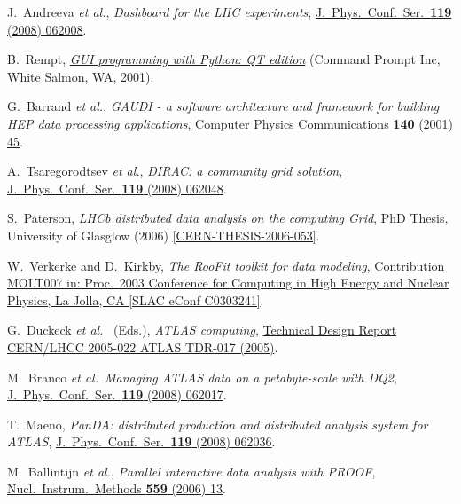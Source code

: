 \documentclass{elsart}
\def\etal {\textit{et al.}}
\begin{document}
\begin{linenumbers}
\begin{thebibliography}{00}
 J.~Andreeva \etal,
\textit{Dashboard for the LHC experiments},
\href{http://dx.doi.org/10.1088/1742-6596/119/6/062008}
{J.\ Phys.\ Conf.\ Ser.\ \textbf{119} (2008) 062008}.

 B.~Rempt,
\href{http://www.commandprompt.com/community/pyqt/}
{\textit{GUI programming with Python: QT edition}}
(Command Prompt Inc, White Salmon, WA, 2001).

 G.~Barrand \etal,
\textit{GAUDI - a software architecture and framework for building HEP
data processing applications},
\href{http://dx.doi.org/10.1016/S0010-4655(01)00254-5}
{Computer Physics Communications \textbf{140} (2001) 45}.

 A.~Tsaregorodtsev \etal,
\textit{DIRAC: a community grid solution},
\href{http://dx.doi.org/10.1088/1742-6596/119/6/062048}
{J.\ Phys.\ Conf.\ Ser.\ \textbf{119} (2008) 062048}.

 S.~Paterson,
\textit{LHCb distributed data analysis on the computing Grid},
PhD Thesis, University of Glasglow (2006)
\href{http://cdsweb.cern.ch/record/995676/}
{[CERN-THESIS-2006-053]}.

 W.~Verkerke and D.~Kirkby,
\textit{The RooFit toolkit for data modeling},
\href{http://www.slac.stanford.edu/econf/C0303241/proc/papers/MOLT007.PDF}
{Contribution MOLT007 in:
Proc.\ 2003 Conference for Computing in High Energy and Nuclear Physics,
La Jolla, CA [SLAC eConf C0303241]}.

 G.~Duckeck \etal~ (Eds.),
\textit{ATLAS computing},
\href{http://cdsweb.cern.ch/record/837738}
{Technical Design Report CERN/LHCC 2005-022 ATLAS TDR-017 (2005)}.

 M.~Branco \etal\,
\textit{Managing ATLAS data on a petabyte-scale with DQ2},
\href{http://dx.doi.org/10.1088/1742-6596/119/6/062017}
{J.~Phys.\ Conf.\ Ser.\ \textbf{119} (2008) 062017}.

 T.~Maeno,
\textit{PanDA: distributed production and distributed analysis system for
ATLAS},
\href{http://dx.doi.org/10.1088/1742-6596/119/6/062036}
{J.~Phys.\ Conf.\ Ser.\ \textbf{119} (2008) 062036}.

 M.~Ballintijn \etal,
\textit{Parallel interactive data analysis with PROOF},
\href{http://dx.doi.org/10.1016/j.nima.2005.11.100}
{Nucl.\ Instrum.\ Methods \textbf{559} (2006) 13}.


\end{thebibliography}
\end{linenumbers}
\end{document}

